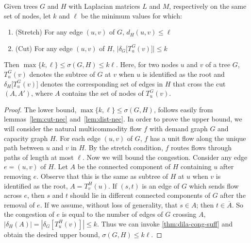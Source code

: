 \begin{theorem}
  \label{thm:cuts-edges-trees}
  Given trees $G$ and $H$ with Laplacian matrices $L$ and
  $M$, respectively on the same set of nodes, let $k$ and $\ell$ be the minimum values for
  which:
  \begin{enumerate}
  \item (Stretch) For any edge $(u,v)$ of $G$, 
   $d_H(u,v) \le \ell$ %
  \item  (Cut) For any edge $(u,v)$ of $H$, 
    $\Big|\delta_G\big[T_u^G(v)\big]\Big| \le k$
  \end{enumerate} 
  Then $\max\{k,\ell\} \le \sigma(G, H) \le k \ell$.
  Here, for two nodes $u$ and $v$ of a tree $G$, $T_u^G(v)$ denotes
  the subtree of $G$ at $v$ when $u$ is identified as the root and
  $\delta_H\big[T_u^G(v)\big]$ denotes the corresponding set of edges
  in $H$ that cross the cut $(A,A')$, where $A$ contains the set of
  nodes of $T_u^G(v)$.
\end{theorem}
%
\begin{proof}
  The lower bound, $\max\{k,\ell\} \le \sigma (G, H)$, follows easily
  from lemmas~\ref{lem:cut-nec} and~\ref{lem:dist-nec}.
  In order to prove the upper bound, we will consider the natural
  multicommodity flow $f$ with demand graph $G$ and capacity
  graph $H$.  For each edge
  $(u,v)$ of $G$, $f$ has a unit flow along the unique path between
  $u$ and $v$ in $H$.   By the stretch condition, $f$ routes flows through
  paths of length at most $\ell$. Now we will bound the congestion.
  Consider any edge $e=(u,v)$ of $H$. Let $A$ be the connected
  component of $H$ containing $u$ after removing $e$.  Observe that
  this is the same as subtree of $H$ at $u$ when $v$ is identified as
  the root, $A = T_v^H(u)$. If $(s,t)$ is an edge of $G$ which sends
  flow across $e$, then $s$ and $t$ should lie in different connected
  components of $G$ after the removal of $e$. If we assume, without
  loss of generality, that $s \in A$; then $t \in \overline{A}$. So
  the congestion of $e$ is equal to the number of edges of $G$
  crossing $A$, $|\delta_H(A)| = |\delta_G[T_u^H(v)]| \le k$. 
   Thus we can invoke \ref{thm:dila-cong-suff} and
  obtain the desired upper bound, $\sigma (G, H) \le k \ell$.
\end{proof}



